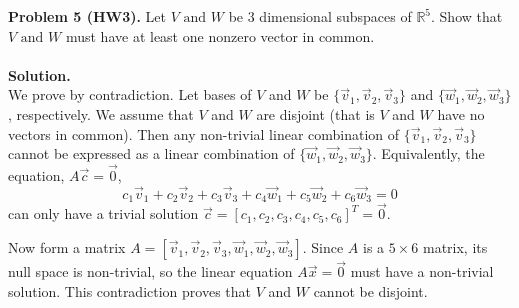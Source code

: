 \documentclass{article}
\newcommand{\R}{\ensuremath{\mathbb{R}}}
\newcommand{\x}{\times}
\newcommand{\tand}{\text{ and }}
\begin{document}
\textbf{Problem 5 (HW3).}
Let $V \tand W$ be 3 dimensional subspaces of $\R^5$. Show that $V \tand W$ must have at least one nonzero vector in common.
\\
\\

\textbf{Solution.}\\
We prove by contradiction. Let bases of $V$ and $W$ be $\{\vec{v}_1, \vec{v}_2, \vec{v}_3\}$ and $\{\vec{w}_1, \vec{w}_2, \vec{w}_3\}$, respectively. We assume that $V$ and $W$ are disjoint (that is $V$ and $W$ have no vectors in common). Then any non-trivial linear combination of $\{\vec{v}_1, \vec{v}_2, \vec{v}_3\}$ cannot be expressed as a linear combination of $\{\vec{w}_1, \vec{w}_2, \vec{w}_3\}$. Equivalently, the equation, $A\vec c = \vec 0$,
\[ c_1\vec{v}_1 + c_2\vec{v}_2 + c_3\vec{v}_3 + c_4\vec{w}_1 + c_5\vec{w}_2 + c_6\vec{w}_3 = 0\]
can only have a trivial solution $\vec{c} = [c_1, c_2, c_3, c_4, c_5, c_6]^T = \vec 0$. 

Now form a matrix $A = [\vec{v}_1, \vec{v}_2, \vec{v}_3, \vec{w}_1, \vec{w}_2, \vec{w}_3]$. Since $A$ is a $5 \x 6$ matrix, its null space is non-trivial, so the linear equation $A\vec{x} = \vec 0$ must have a non-trivial solution. This contradiction proves that $V$ and $W$ cannot be disjoint. 
\end{document}
